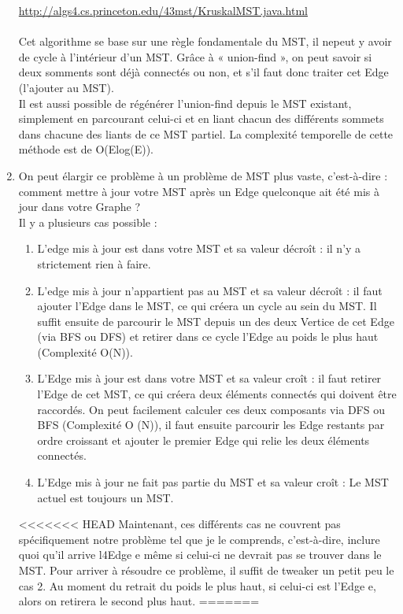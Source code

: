 \documentclass[11pt]{article}
\begin{document}
\begin{enumerate}
\url{http://algs4.cs.princeton.edu/43mst/KruskalMST.java.html}
\\
\\
Cet algorithme se base sur une règle fondamentale du MST, il nepeut y avoir de cycle à l’intérieur d’un MST. Grâce à « union-find », on peut savoir si deux somments sont déjà connectés ou non, et s’il faut donc traiter cet Edge (l’ajouter au MST).
\\
Il est aussi possible de régénérer l’union-find depuis le MST existant, simplement en parcourant celui-ci et en liant chacun des différents sommets dans chacune des liants de ce MST partiel.
La complexité temporelle de cette méthode est de O(Elog(E)).\\

\item On peut élargir ce problème à un problème de MST plus vaste, c’est-à-dire : comment mettre à jour votre MST après un Edge quelconque  ait été mis à jour dans votre Graphe ? \\
Il y a plusieurs cas possible :
\begin{enumerate}
	
	\item L’edge mis à jour est dans votre MST et sa valeur décroît : il n’y a strictement rien à faire.
	\item L’edge mis à jour n’appartient pas au MST et sa valeur décroît : il faut ajouter l’Edge dans le MST, ce qui créera un 		cycle au sein du MST. Il suffit ensuite de parcourir le MST depuis un des deux Vertice de cet Edge (via BFS ou DFS) et 			retirer dans ce cycle l’Edge au poids le plus haut (Complexité O(N)).
	\item L’Edge mis à jour est dans votre MST et sa valeur croît : il faut retirer  l’Edge de cet MST, ce qui créera deux éléments connectés qui doivent être raccordés. On peut facilement calculer ces deux composants via DFS ou BFS (Complexité O	(N)), il faut ensuite parcourir les Edge restants par ordre croissant et ajouter le premier Edge qui relie les deux éléments connectés.
	\item L’Edge mis à jour ne fait pas partie du MST et sa valeur croît : Le MST actuel est toujours un MST.
	
	\end{enumerate}
<<<<<<< HEAD
Maintenant, ces différents cas ne couvrent pas spécifiquement notre problème tel que je le comprends, c’est-à-dire, inclure quoi qu’il arrive l4Edge e même si celui-ci ne devrait pas se trouver dans le MST. Pour arriver à résoudre ce problème, il suffit de tweaker un petit peu le cas 2. Au moment du retrait du poids le plus haut, si celui-ci est l’Edge e, alors on retirera le second plus haut.
=======


\end{enumerate}
\end{document}
